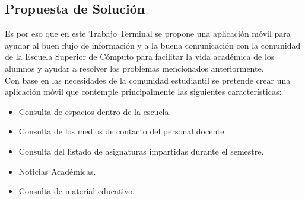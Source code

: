 	\subsection{Propuesta de Solución}
	
	Es por eso que en este Trabajo Terminal se propone una aplicación móvil para ayudar al buen flujo de información y a la buena comunicación con la comunidad de la Escuela Superior de Cómputo para facilitar la vida académica de los alumnos y ayudar a resolver los problemas mencionados anteriormente.\\
	
	Con base en las necesidades de la comunidad estudiantil se pretende crear una aplicación móvil que contemple principalmente las siguientes características:
	\begin{itemize}
		\item Consulta de espacios dentro de la escuela.
		\item Consulta de los medios de contacto del personal docente.
		\item Consulta del listado de asignaturas impartidas durante el semestre.
		\item Noticias Académicas.
		\item  Consulta de material educativo.
	\end{itemize}
